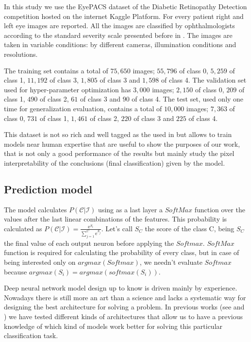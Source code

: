 \documentclass[preprint]{elsarticle}
\theoremstyle{definition} %
\theoremstyle{remark}
\newcommand{\me}{\mathrm{e}} %
\begin{document}
In this study we use the EyePACS dataset of the Diabetic Retinopathy Detection competition hosted on the internet Kaggle Platform.  For every patient right and left eye images are reported. All the images are classified by ophthalmologists according to the standard severity scale presented before in \cite{diaclass}. The images are taken in variable conditions: by different cameras, illumination conditions and resolutions. 

The training set contains a total of $75,650$ images; $55,796$ of class 0, $5,259$ of class 1, $11,192$ of class 3, $1,805$ of class 3 and $1,598$ of class 4. The validation set used for hyper-parameter optimization has $3,000$ images; $2,150$ of class 0, $209$ of class 1, $490$ of class 2, $61$ of class 3 and $90$ of class 4. The test set, used only one time for generalization evaluation, contains a total of $10,000$ images; $7,363$ of class 0, $731$ of class 1, $1,461$ of class 2, $220$ of class 3 and $225$ of class 4. 

This dataset is not so rich and well tagged as the used in \citep{doi:10.1001/jama.2016.17216} but allows to train models near human expertise that are useful to show the purposes of our work, that is not only a good performance of the results but mainly study the pixel interpretability of the conclusions (final classification) given by the model.

\subsection{Prediction model}

The model calculates $P(\mathcal{C} | \mathcal{I})$ using as a last layer a $SoftMax$ function over the values after the last linear combinations of the features. This probability is calculated as $P(\mathcal{C} | \mathcal{I}) = \frac{\me^{S_{i}}}{\sum_{j=1}^{C} \me^{S_{j}}}$. Let's call $S_{C}$ the score of the class C, being $S_C$ the final value of each output neuron before applying the $Softmax$. $SoftMax$ function is required for calculating the probability of every class, but in case of being interested only on $argmax(Softmax)$, we needn't evaluate $Softmax$ because $argmax(S_i) = argmax(softmax(S_i))$.

Deep neural network model design up to know is driven mainly by experience. Nowadays there is still more an art than a science and lacks a systematic way for designing the best architecture for solving a problem. In previous works (see \cite{jdelatorre-2016} and \cite{jdelatorre-2017}) we have tested different kinds of architectures that allow us to have a previous knowledge of which kind of models work better for solving this particular classification task.
\end{document}
